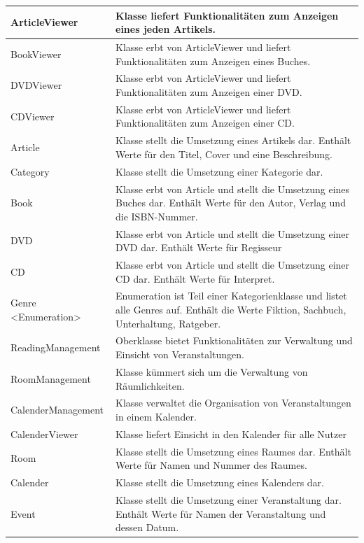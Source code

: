 \documentclass[a4paper]{article}
\begin{document}
\begin{longtable}{|p{100px}|p{250px}|}
	ArticleViewer & Klasse liefert Funktionalitäten zum Anzeigen eines jeden Artikels. \\ \hline
	BookViewer & Klasse erbt von ArticleViewer und liefert Funktionalitäten zum Anzeigen eines Buches. \\ \hline
	DVDViewer & Klasse erbt von ArticleViewer und liefert Funktionalitäten zum Anzeigen einer DVD. \\ \hline
	CDViewer & Klasse erbt von ArticleViewer und liefert Funktionalitäten zum Anzeigen einer CD. \\ \hline
	Article & Klasse stellt die Umsetzung eines Artikels dar. Enthält Werte für den Titel, Cover und eine Beschreibung. \\ \hline
	Category & Klasse stellt die Umsetzung einer Kategorie dar. \\ \hline
	Book & Klasse erbt von Article und stellt die Umsetzung eines Buches dar. Enthält Werte für den Autor, Verlag und die ISBN-Nummer. \\ \hline
	DVD & Klasse erbt von Article und stellt die Umsetzung einer DVD dar. Enthält Werte für Regisseur \\ \hline
	CD & Klasse erbt von Article und stellt die Umsetzung einer CD dar. Enthält Werte für Interpret. \\ \hline
	Genre <Enumeration> & Enumeration ist Teil einer Kategorienklasse und listet alle Genres auf. Enthält die Werte Fiktion, Sachbuch, Unterhaltung, Ratgeber. \\ \hline
	ReadingManagement & Oberklasse bietet Funktionalitäten zur Verwaltung und Einsicht von Veranstaltungen. \\ \hline
	RoomManagement & Klasse kümmert sich um die Verwaltung von Räumlichkeiten. \\ \hline
	CalenderManagement & Klasse verwaltet die Organisation von Veranstaltungen in einem Kalender. \\ \hline
	CalenderViewer & Klasse liefert Einsicht in den Kalender für alle Nutzer \\ \hline
	Room & Klasse stellt die Umsetzung eines Raumes dar. Enthält Werte für Namen und Nummer des Raumes. \\ \hline
	Calender & Klasse stellt die Umsetzung eines Kalenders dar. \\ \hline
	Event & Klasse stellt die Umsetzung einer Veranstaltung dar. Enthält Werte für Namen der Veranstaltung und dessen Datum. \\ \hline
\end{longtable}
\end{document}
